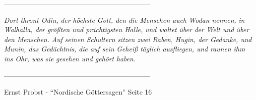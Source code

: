 \vfill

\begin{center}
---------------------------------------------------------------
\end{center}


\textsl{Dort thront Odin, der höchste Gott, den die Menschen auch Wodan nennen, in Walhalla, der größten und prächtigsten Halle, und waltet über der Welt und über den Menschen. Auf seinen Schultern sitzen zwei Raben, Hugin, der Gedanke, und Munin, das Gedächtnis, die auf sein Geheiß täglich ausfliegen, und raunen ihm ins Ohr, was sie gesehen und gehört haben.}

\begin{center}
---------------------------------------------------------------
\end{center}

\begin{flushright}
Ernst Probst - "`Nordische Göttersagen"' \cite{Pro02} Seite 16 
\end{flushright}

\thispagestyle{empty}
\newpage

\makeatother 
